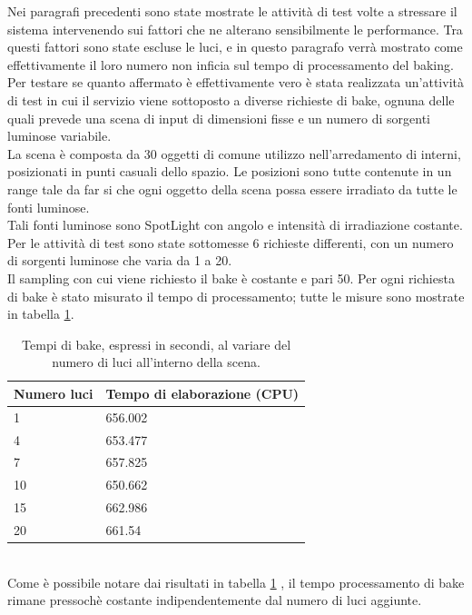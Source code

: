 Nei paragrafi precedenti sono state mostrate le attività di test volte a stressare il sistema intervenendo sui fattori che ne alterano sensibilmente le performance. Tra questi fattori sono state escluse le luci, e in questo paragrafo verrà mostrato come effettivamente il loro numero non inficia sul tempo di processamento del baking.
\\
Per testare se quanto affermato è effettivamente vero è stata realizzata un’attività di test in cui il servizio viene sottoposto a diverse richieste di bake, ognuna delle quali prevede una scena di input di dimensioni fisse e un numero di sorgenti luminose variabile. 
\\
La scena è composta da 30 oggetti di comune utilizzo nell’arredamento di interni, posizionati in punti casuali dello spazio. Le posizioni sono tutte contenute in un range tale da far si che ogni oggetto della scena possa essere irradiato da tutte le fonti luminose. 
\\
Tali fonti  luminose sono SpotLight con angolo e intensità di irradiazione costante. Per le attività di test sono state sottomesse 6 richieste differenti, con un numero di sorgenti luminose che varia da 1 a 20.
\\
Il sampling con cui viene richiesto il bake è costante e pari 50. 
Per ogni richiesta di bake è stato misurato il tempo di processamento; tutte le misure sono mostrate in tabella \ref{table:per_luci}.
\begin{table}[h]
\centering
\caption[Performance al variare delle luci]{Tempi di bake, espressi in secondi, al variare del numero di luci all'interno della scena.}
\begin{tabular}{|l|l|}
\hline
\textbf{Numero luci} & \textbf{Tempo di elaborazione (CPU)} \\ \hline
1 & 656.002 \\ \hline
4 & 653.477 \\ \hline
7 & 657.825 \\ \hline
10 & 650.662 \\ \hline
15 & 662.986 \\ \hline
20 & 661.54 \\ \hline
\end{tabular}
\label{table:per_luci}
\end{table}
\\
Come è possibile notare dai risultati in tabella \ref{table:per_luci} , il tempo processamento di bake rimane pressochè costante indipendentemente dal numero di luci aggiunte. 
\\
